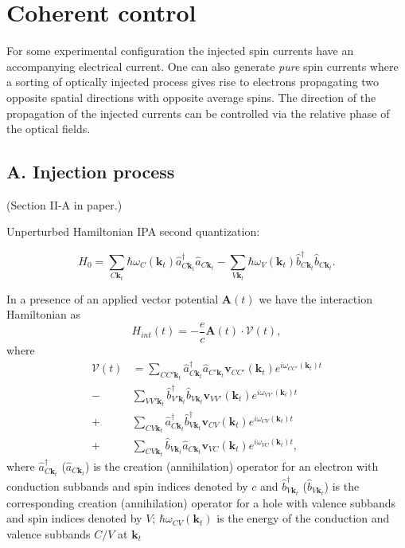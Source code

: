 \documentclass{article}
\newcommand{\kt}{\mathbf{k}_{t}}
\begin{document}
\section{Coherent control} %
\label{sec:coherent_control}
For some experimental configuration the injected spin currents have an
accompanying electrical current. One can also generate \emph{pure} spin currents
where a sorting of optically injected process gives rise to electrons
propagating two opposite spatial directions with opposite average spins. The
direction of the propagation of the injected currents can be controlled via the
relative phase of the optical fields.

\subsection{A. Injection process}
{\small (Section II-A in paper.) \\}

Unperturbed Hamiltonian IPA second quantization:

\begin{equation*}\label{eq:unperturbed_hamiltonian}
H_{0} = \sum_{C\kt} \hbar \omega_{C}(\kt) \hat{a}^{\dag}_{C\kt} \hat{a}^{}_{C\kt}  - 
        \sum_{V\kt} \hbar \omega_{V}(\kt) \hat{b}^{\dag}_{C\kt} \hat{b}^{}_{C\kt}.
\end{equation*}

In a presence of an applied vector potential $\mathbf{A}(t)$ we have the
interaction Hamiltonian as
\begin{equation*}\label{interaction_hamiltonian}
H_{int}(t) = - \frac{e}{c} \mathbf{A}(t) \cdot \mathcal{V}(t),
\end{equation*}
where
\begin{align*}
\mathcal{V}(t)  
&= \sum_{CC'\kt} \hat{a}^{\dag}_{C \kt} \hat{a}       _{C'\kt} 
\mathbf{v}_{CC'}(\kt) e^{i\omega_{CC'}(\kt)t} \\
-& \sum_{VV'\kt} \hat{b}^{\dag}_{V'\kt} \hat{b}       _{V \kt} 
\mathbf{v}_{VV'}(\kt) e^{i\omega_{VV'}(\kt)t} \\
+& \sum_{CV \kt} \hat{a}^{\dag}_{C \kt} \hat{b}^{\dag}_{V \kt} 
\mathbf{v}_{CV }(\kt) e^{i\omega_{CV }(\kt)t} \\
+& \sum_{CV \kt} \hat{b}       _{V \kt} \hat{a}       _{C \kt} 
\mathbf{v}_{VC }(\kt) e^{i\omega_{VC }(\kt)t},
\end{align*}
where $\hat{a}^{\dag}_{C\kt} $ ($\hat{a}_{C\kt}$) is the creation (annihilation)
operator for an electron with conduction subbands and spin indices denoted by
$c$ and $\hat{b}^{\dag}_{V\kt} $ ($\hat{b}_{V\kt}$) is the corresponding
creation (annihilation) operator for a hole with valence subbands and spin
indices denoted by $V$; $\hbar\omega_{CV}(\kt)$ is the energy of the conduction
and valence subbands $C/V$ at $\kt$
\end{document}

